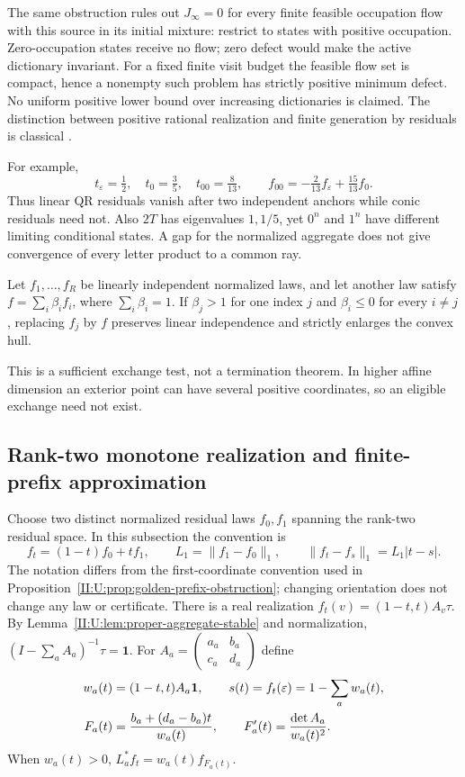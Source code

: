 The same obstruction rules out $J_\infty=0$ for every finite feasible
occupation flow with this source in its initial mixture: restrict to
states with positive occupation. Zero-occupation states receive no
flow; zero defect would make the active dictionary invariant. For a
fixed finite visit budget the feasible flow set is compact, hence a
nonempty such problem has strictly positive minimum defect. No
uniform positive lower bound over increasing dictionaries is claimed.
The distinction between positive rational realization and finite
generation by residuals is classical \citep{denis2008}.

For example,
\[
 t_\varepsilon=\tfrac12,\quad t_0=\tfrac35,\quad t_{00}=\tfrac8{13},
 \qquad f_{00}=-\tfrac2{13}f_\varepsilon+\tfrac{15}{13}f_0.
\]
Thus linear QR residuals vanish after two independent anchors while
conic residuals need not. Also $2T$ has eigenvalues $1,1/5$, yet
$0^n$ and $1^n$ have different limiting conditional states. A gap for
the normalized aggregate does not give convergence of every letter
product to a common ray.

\begin{lemma}
\label{II:U:lem:simplex-exchange}
Let $f_1,\ldots,f_R$ be linearly independent normalized laws, and let
another law satisfy $f=\sum_i\beta_i f_i$, where $\sum_i\beta_i=1$.
If $\beta_j>1$ for one index $j$ and $\beta_i\le0$ for every $i\ne j$,
replacing $f_j$ by $f$ preserves linear independence and strictly
enlarges the convex hull.
\end{lemma}

This is a sufficient exchange test, not a termination theorem.
In higher affine dimension an exterior point can have several
positive coordinates, so an eligible exchange need not exist.

\subsection{Rank-two monotone realization and finite-prefix approximation}
\label{II:U:sec:rank-two-monotone}
Choose two distinct normalized residual laws $f_0,f_1$ spanning the
rank-two residual space. In this subsection the convention is
\[
 f_t=(1-t)f_0+tf_1,\qquad
 L_1=\|f_1-f_0\|_1,\qquad \|f_t-f_s\|_1=L_1|t-s|.
\]
The notation differs from the first-coordinate convention used in
Proposition~\ref{II:U:prop:golden-prefix-obstruction}; changing orientation
does not change any law or certificate. There is a real realization
$f_t(v)=(1-t,t)A_v\tau$. By Lemma~\ref{II:U:lem:proper-aggregate-stable}
and normalization, $(I-\sum_a A_a)^{-1}\tau=\mathbf1$.
For $A_a=\left(\begin{smallmatrix}a_a&b_a\\c_a&d_a\end{smallmatrix}\right)$
define
\begin{align}
 w_a(t)&=(1-t,t)A_a\mathbf1,\qquad s(t)=f_t(\varepsilon)
                  =1-\sum_a w_a(t),\notag\\
 F_a(t)&=\frac{b_a+(d_a-b_a)t}{w_a(t)},\qquad
 F_a'(t)=\frac{\det A_a}{w_a(t)^2}.
 \label{II:U:eq:rank-two-projective}
\end{align}
When $w_a(t)>0$, $L_a^*f_t=w_a(t)f_{F_a(t)}$.

